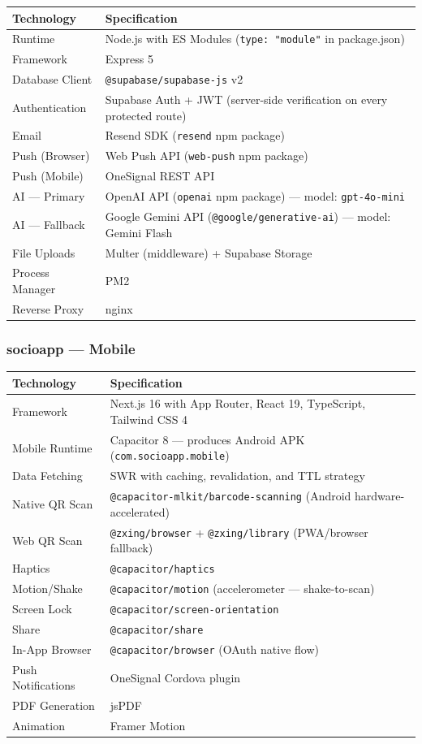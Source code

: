 \documentclass[12pt,a4paper]{article}
\begin{document}
\begin{tabularx}{\textwidth}{L{4cm} X}
\toprule
{}
\textbf{Technology} & \textbf{Specification} \\
\midrule
Runtime & Node.js with ES Modules (\texttt{type: "module"} in package.json) \\
Framework & Express 5 \\
Database Client & \texttt{@supabase/supabase-js} v2 \\
Authentication & Supabase Auth + JWT (server-side verification on every protected route) \\
Email & Resend SDK (\texttt{resend} npm package) \\
Push (Browser) & Web Push API (\texttt{web-push} npm package) \\
Push (Mobile) & OneSignal REST API \\
AI — Primary & OpenAI API (\texttt{openai} npm package) — model: \texttt{gpt-4o-mini} \\
AI — Fallback & Google Gemini API (\texttt{@google/generative-ai}) — model: Gemini Flash \\
File Uploads & Multer (middleware) + Supabase Storage \\
Process Manager & PM2 \\
Reverse Proxy & nginx \\
\bottomrule
\end{tabularx}

\subsubsection{socioapp — Mobile}

\begin{tabularx}{\textwidth}{L{4cm} X}
\toprule
{}
\textbf{Technology} & \textbf{Specification} \\
\midrule
Framework & Next.js 16 with App Router, React 19, TypeScript, Tailwind CSS 4 \\
Mobile Runtime & Capacitor 8 — produces Android APK (\texttt{com.socioapp.mobile}) \\
Data Fetching & SWR with caching, revalidation, and TTL strategy \\
Native QR Scan & \texttt{@capacitor-mlkit/barcode-scanning} (Android hardware-accelerated) \\
Web QR Scan & \texttt{@zxing/browser} + \texttt{@zxing/library} (PWA/browser fallback) \\
Haptics & \texttt{@capacitor/haptics} \\
Motion/Shake & \texttt{@capacitor/motion} (accelerometer — shake-to-scan) \\
Screen Lock & \texttt{@capacitor/screen-orientation} \\
Share & \texttt{@capacitor/share} \\
In-App Browser & \texttt{@capacitor/browser} (OAuth native flow) \\
Push Notifications & OneSignal Cordova plugin \\
PDF Generation & jsPDF \\
Animation & Framer Motion \\
\bottomrule
\end{tabularx}
\end{document}
